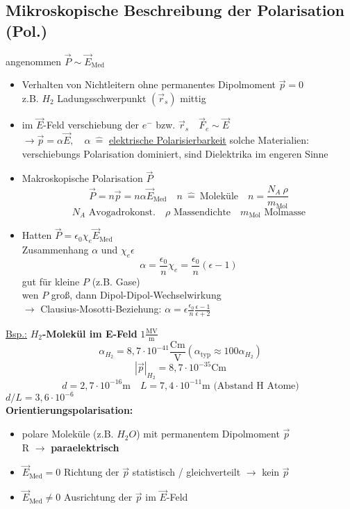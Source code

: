 \documentclass[titlepage,12pt,a4paper,ngerman]{report}
\newcommand{\tx}[1]{\textrm{#1}}
\begin{document}
\subsection{Mikroskopische Beschreibung der Polarisation (Pol.)}
angenommen $\vec{P} \sim \vec{E}_{\tx{Med}}$
\begin{itemize}
\item Verhalten von Nichtleitern ohne permanentes Dipolmoment $\vec{p} = 0$\\
z.B. $H_2$ Ladungsschwerpunkt $(\vec{r}_s)$ mittig 
\item im $\vec{E}$-Feld verschiebung der $e^-$ bzw. $\vec{r}_s \quad \vec{F}_e \sim \vec{E}$\\
$\rightarrow \vec{p} = \alpha \vec{E},\quad  \alpha\ \widehat{=}$ \underline{elektrische Polarisierbarkeit} solche Materialien: verschiebungs Polarisation dominiert, sind Dielektrika im engeren Sinne
\item Makroskopische Polarisation $\vec{P}$
$$\vec{P} = n \vec{p}  = n \alpha \vec{E}_{\tx{Med}} \quad n \ \widehat{ = }\  \tx{Moleküle} \quad  n = \frac{N_A\ \rho}{m_{\tx{Mol}}}$$
$$ N_A \tx{ Avogadrokonst.} \quad \rho \tx{ Massendichte} \quad m_{\tx{Mol}} \tx{ Molmasse}$$
\item Hatten $ \vec{P} = \epsilon_0 \chi_e \vec{E}_{\tx{Med}}$\\
Zusammenhang $\alpha$ und $\chi_e \epsilon$
$$\boxed{ \alpha = \frac{\epsilon_0}{n} \chi_e = \frac{\epsilon_0}{n} (\epsilon-1)
}$$
gut für kleine $P$ (z.B. Gase)\\
wen $P$ groß, dann Dipol-Dipol-Wechselwirkung\\
$\rightarrow$ Clausius-Mosotti-Beziehung: $\alpha = \epsilon \frac{\epsilon_0}{n} \frac{\epsilon-1}{\epsilon+2}$
\end{itemize}
\underline{Bsp.:} \textbf{ $H_2$-Molekül im E-Feld} $1\frac{\tx{MV}}{\tx{m}}$
$$\alpha_{H_2} = 8,7 \cdot 10^{-41} \frac{\tx{Cm}}{\tx{V}} (\alpha_{\tx{typ}} \approx 100 \alpha_{H_2})$$
$$|\vec{p}|_{H_2} = 8,7 \cdot 10^{-35} \tx{Cm}$$
$$d = 2,7\cdot 10^{-16} \tx{m} \quad L = 7,4 \cdot 10^{-11}\tx{m} \tx{ (Abstand H Atome)}$$
$d/L = 3,6\cdot 10^{-6}$\\[5pt]
\textbf{Orientierungspolarisation:}
\begin{itemize}
\item polare Moleküle (z.B. $H_2O$) mit permanentem Dipolmoment $\vec{p}$\\R
$\rightarrow $ \textbf{paraelektrisch}
\item$\vec{E}_{\tx{Med}} = 0 $ Richtung der $ \vec{p}$ statistisch / gleichverteilt $\rightarrow$ kein $\vec{p}$
\item $\vec{E}_{\tx{Med}} \neq 0$ Ausrichtung der $\vec{p}$ im $\vec{E}$-Feld
\end{itemize}
\end{document}
